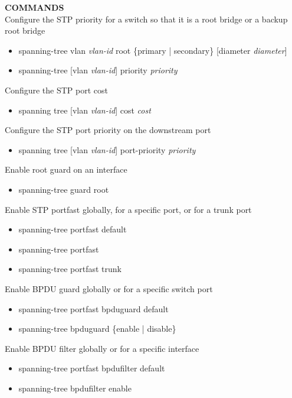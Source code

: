 \documentclass{article}
\begin{document}
\noindent\textbf{COMMANDS}\\
Configure the STP priority for a switch so that it is a root bridge or a backup root bridge
\begin{itemize}
\item spanning-tree vlan \textit{vlan-id} root \{primary | secondary\} [diameter \textit{diameter}]
\item spanning-tree [vlan \textit{vlan-id}] priority \textit{priority}
\end{itemize}

Configure the STP port cost
\begin{itemize}
\item spanning tree [vlan \textit{vlan-id}] cost \textit{cost}
\end{itemize}

Configure the STP port priority on the downstream port
\begin{itemize}
\item spanning tree [vlan \textit{vlan-id}] port-priority \textit{priority}
\end{itemize}

Enable root guard on an interface
\begin{itemize}
\item spanning-tree guard root
\end{itemize}

Enable STP portfast globally, for a specific port, or for a trunk port
\begin{itemize}
\item spanning-tree portfast default
\item spanning-tree portfast
\item spanning-tree portfast trunk
\end{itemize}

Enable BPDU guard globally or for a specific switch port
\begin{itemize}
\item spanning-tree portfast bpduguard default
\item spanning-tree bpduguard \{enable | disable\}
\end{itemize}

Enable BPDU filter globally or for a specific interface
\begin{itemize}
\item spanning-tree portfast bpdufilter default
\item spanning-tree bpdufilter enable
\end{itemize}
\end{document}
